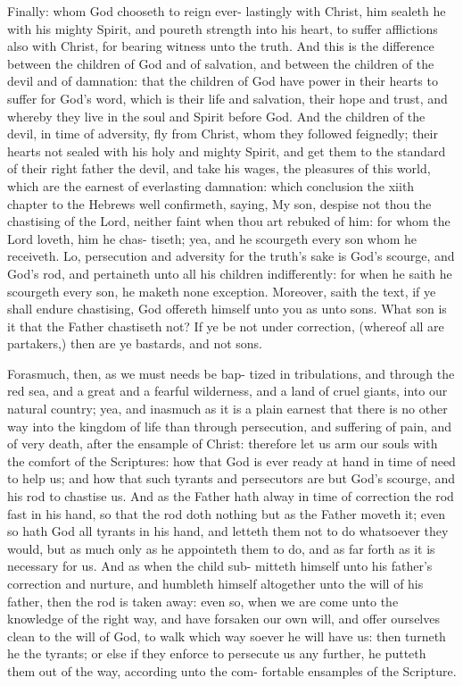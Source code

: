 \documentclass{custom}
\begin{document}
Finally: whom God chooseth to reign ever- 
lastingly with Christ, him sealeth he with his 
mighty Spirit, and poureth strength into his 
heart, to suffer afflictions also with Christ, for 
bearing witness unto the truth. And this is the 
difference between the children of God and of 
salvation, and between the children of the devil 
and of damnation: that the children of God
have power in their hearts to suffer for God's 
word, which is their life and salvation, their 
hope and trust, and whereby they live in 
the soul and Spirit before God. And the 
children of the devil, in time of adversity, 
fly from Christ, whom they followed feignedly; 
their hearts not sealed with his holy and mighty 
Spirit, and get them to the standard of their 
right father the devil, and take his wages, the
pleasures of this world, which are the earnest of
everlasting damnation: which conclusion the 
xiith chapter to the Hebrews well confirmeth, 
saying, My son, despise not thou the chastising of 
the Lord, neither faint when thou art rebuked of 
him: for whom the Lord loveth, him he chas-
tiseth; yea, and he scourgeth every son whom
he receiveth. Lo, persecution and adversity for
the truth's sake is God's scourge, and God's rod, 
and pertaineth unto all his children indifferently:
for when he saith he scourgeth every son, he 
maketh none exception. Moreover, saith the 
text, if ye shall endure chastising, God offereth 
himself unto you as unto sons. What son is it 
that the Father chastiseth not? If ye be not 
under correction, (whereof all are partakers,) 
then are ye bastards, and not sons. 

Forasmuch, then, as we must needs be bap- 
tized in tribulations, and through the red sea, 
and a great and a fearful wilderness, and a land 
of cruel giants, into our natural country; yea,
and inasmuch as it is a plain earnest that there
is no other way into the kingdom of life than
through persecution, and suffering of pain, and 
of very death, after the ensample of Christ:
therefore let us arm our souls with the comfort 
of the Scriptures: how that God is ever ready 
at hand in time of need to help us; and how 
that such tyrants and persecutors are but God's 
scourge, and his rod to chastise us. And as the 
Father hath alway in time of correction the rod 
fast in his hand, so that the rod doth nothing but 
as the Father moveth it; even so hath God all 
tyrants in his hand, and letteth them not to do 
whatsoever they would, but as much only as he 
appointeth them to do, and as far forth as it is 
necessary for us. And as when the child sub- 
mitteth himself unto his father's correction and 
nurture, and humbleth himself altogether unto the 
will of his father, then the rod is taken away:
even so, when we are come unto the knowledge 
of the right way, and have forsaken our own 
will, and offer ourselves clean to the will of 
God, to walk which way soever he will have us:
then turneth he the tyrants; or else if they 
enforce to persecute us any further, he putteth
them out of the way, according unto the com- 
fortable ensamples of the Scripture. 
\end{document}
